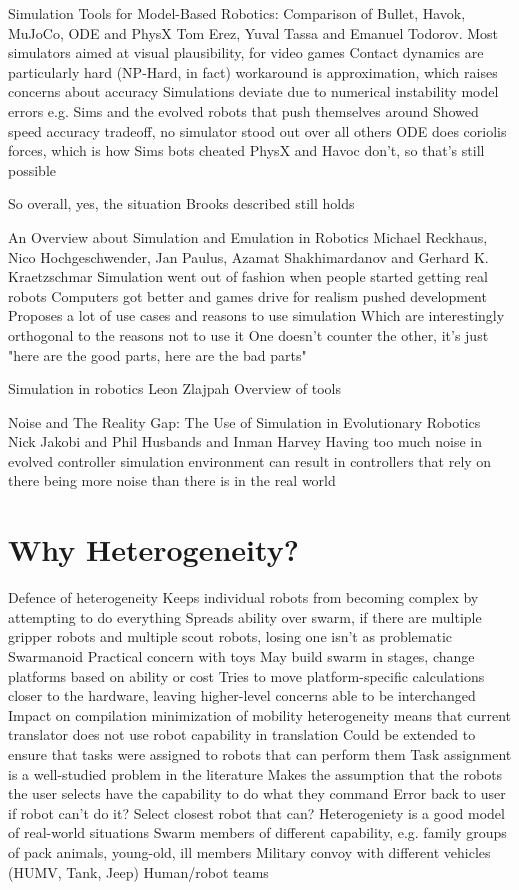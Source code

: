 Simulation Tools for Model-Based Robotics: Comparison of Bullet, Havok, MuJoCo, ODE and PhysX
Tom Erez, Yuval Tassa and Emanuel Todorov.
	Most simulators aimed at visual plausibility, for video games
	Contact dynamics are particularly hard (NP-Hard, in fact)
		workaround is approximation, which raises concerns about accuracy
	Simulations deviate due to
		numerical instability
		model errors
			e.g. Sims and the evolved robots that push themselves around
	Showed speed accuracy tradeoff, no simulator stood out over all others
	ODE does coriolis forces, which is how Sims bots cheated 
	PhysX and Havoc don't, so that's still possible

	So overall, yes, the situation Brooks described still holds

An Overview about Simulation and Emulation in Robotics
Michael Reckhaus, Nico Hochgeschwender, Jan Paulus, Azamat Shakhimardanov and Gerhard K. Kraetzschmar
	Simulation went out of fashion when people started getting real robots
	Computers got better and games drive for realism pushed development
	Proposes a lot of use cases and reasons to use simulation
		Which are interestingly orthogonal to the reasons not to use it
			One doesn't counter the other, it's just "here are the good parts, here are the bad parts"

Simulation in robotics
Leon Zlajpah
	Overview of tools

Noise and The Reality Gap: The Use of Simulation in Evolutionary Robotics
Nick Jakobi and Phil Husbands and Inman Harvey
	Having too much noise in evolved controller simulation environment can result in controllers that rely on there being more noise than there is in the real world
	
\section{Why Heterogeneity?}
Defence of heterogeneity
	Keeps individual robots from becoming complex by attempting to do everything
		Spreads ability over swarm, if there are multiple gripper robots and multiple scout robots, losing one isn't as problematic
		Swarmanoid
	Practical concern with toys
		May build swarm in stages, change platforms based on ability or cost
		Tries to move platform-specific calculations closer to the hardware, leaving higher-level concerns able to be interchanged
	Impact on compilation
		minimization of mobility heterogeneity means that current translator does not use robot capability in translation
		Could be extended to ensure that tasks were assigned to robots that can perform them
			Task assignment is a well-studied problem in the literature
			Makes the assumption that the robots the user selects have the capability to do what they command
				Error back to user if robot can't do it? Select closest robot that can?
	Heterogeniety is a good model of real-world situations
		Swarm members of different capability, e.g. family groups of pack animals, young-old, ill members
		Military convoy with different vehicles (HUMV, Tank, Jeep)
		Human/robot teams 

	